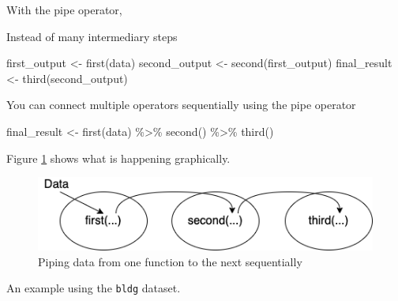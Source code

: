 \documentclass[
]{book}
\newenvironment{Shaded}{\begin{snugshade}}{\end{snugshade}}
\newcommand{\FunctionTok}[1]{\textcolor[rgb]{0.00,0.00,0.00}{#1}}
\newcommand{\NormalTok}[1]{#1}
\newcommand{\OtherTok}[1]{\textcolor[rgb]{0.56,0.35,0.01}{#1}}
\newcommand{\SpecialCharTok}[1]{\textcolor[rgb]{0.00,0.00,0.00}{#1}}
\begin{document}
With the pipe operator,

Instead of many intermediary steps

\begin{Shaded}
\begin{Highlighting}[]
\NormalTok{first\_output }\OtherTok{\textless{}{-}} \FunctionTok{first}\NormalTok{(data)}
\NormalTok{second\_output }\OtherTok{\textless{}{-}} \FunctionTok{second}\NormalTok{(first\_output)}
\NormalTok{final\_result }\OtherTok{\textless{}{-}} \FunctionTok{third}\NormalTok{(second\_output)}
\end{Highlighting}
\end{Shaded}

You can connect multiple operators sequentially using the pipe operator

\begin{Shaded}
\begin{Highlighting}[]
\NormalTok{final\_result }\OtherTok{\textless{}{-}} \FunctionTok{first}\NormalTok{(data) }\SpecialCharTok{\%\textgreater{}\%}
  \FunctionTok{second}\NormalTok{() }\SpecialCharTok{\%\textgreater{}\%}
  \FunctionTok{third}\NormalTok{()}
\end{Highlighting}
\end{Shaded}

Figure \ref{fig:pipe} shows what is happening graphically.

\begin{figure}

{\centering \includegraphics[width=0.7\linewidth]{figures/pipe} 

}

\caption{Piping data from one function to the next sequentially}\label{fig:pipe}
\end{figure}

An example using the \texttt{bldg} dataset.
\end{document}

